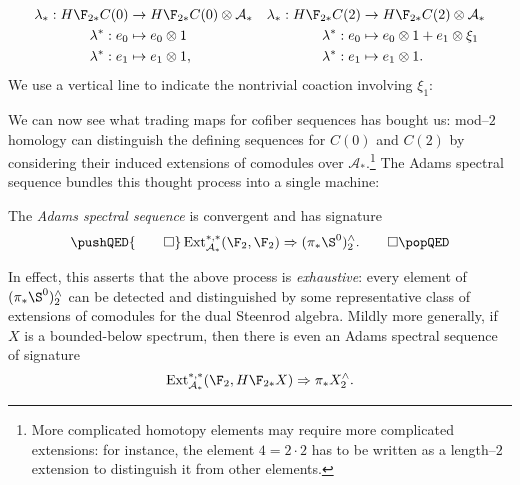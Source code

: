 \begin{align*}
\lambda_*: H\F_{2*} C(0) & \to H\F_{2*} C(0) \otimes \mathcal A_* & \lambda_*: H\F_{2*} C(2) & \to H\F_{2*} C(2) \otimes \mathcal A_* \\
\lambda^*: e_0 & \mapsto e_0 \otimes 1 & \lambda^*: e_0 & \mapsto e_0 \otimes 1 + e_1 \otimes \xi_1 \\
\lambda^*: e_1 & \mapsto e_1 \otimes 1, & \lambda^*: e_1 & \mapsto e_1 \otimes 1.
\end{align*}
We use a vertical line to indicate the nontrivial coaction involving \(\xi_1\):
\begin{center}
\end{center}
We can now see what trading maps for cofiber sequences has bought us: mod--\(2\) homology can distinguish the defining sequences for \(C(0)\) and \(C(2)\) by considering their induced extensions of comodules over \(\mathcal A_*\).\footnote{More complicated homotopy elements may require more complicated extensions: for instance, the element \(4 = 2 \cdot 2\) has to be written as a length--\(2\) extension to distinguish it from other elements.}  The Adams spectral sequence bundles this thought process into a single machine:
\begin{theorem}
The \textit{Adams spectral sequence} is convergent and has signature
\[
\pushQED{\qed}
\Ext_{\mathcal A_*}^{*, *}(\F_2, \F_2) \Rightarrow (\pi_* \S^0)^\wedge_2.\qedhere
\popQED
\]
\end{theorem}
In effect, this asserts that the above process is \emph{exhaustive}: every element of \((\pi_* \S^0)^\wedge_2\) can be detected and distinguished by some representative class of extensions of comodules for the dual Steenrod algebra.  Mildly more generally, if \(X\) is a bounded-below spectrum, then there is even an Adams spectral sequence of signature \[\Ext_{\mathcal A_*}^{*, *}(\F_2, H\F_{2*} X) \Rightarrow \pi_* X^\wedge_2.\]

